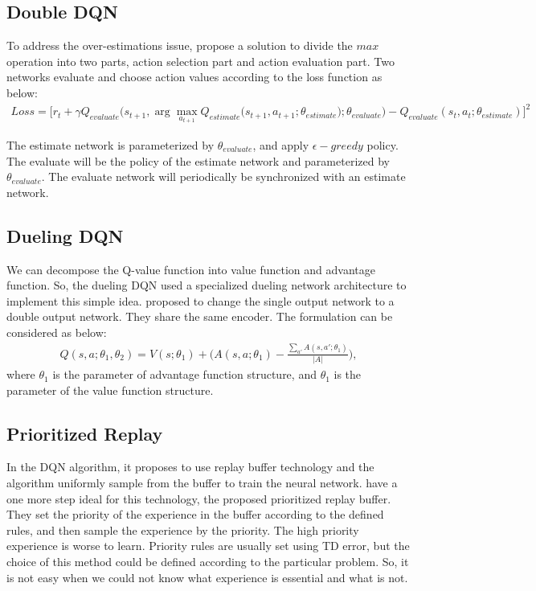 \documentclass{article}
\begin{document}
\subsection{Double DQN}

To address the over-estimations  issue, \citep{van2016deep} propose a solution to divide the $max$ operation into two parts, action selection part and action evaluation part.  Two networks evaluate and choose action values according to the loss function as below:
$$
\begin{aligned}
Loss=\Big[ r_t + \gamma {Q}_{evaluate} \Big(s_{t+1}, \arg \underset{a_{t+1}}{\max} {Q}_{estimate} \big(s_{t+1}, a_{t+1};{\theta}_{estimate} \big); {\theta}_{evaluate} \Big) - {Q}_{evaluate}(s_t,a_t;{\theta}_{estimate}) \Big]^2
\end{aligned}
$$

The estimate network is parameterized by ${\theta}_{evaluate}$, and apply $\epsilon-greedy$ policy. The evaluate will be the policy of the estimate network and parameterized by ${\theta}_{evaluate}$. The evaluate network will periodically be synchronized with an estimate network.

\subsection{Dueling DQN}

We can decompose the Q-value function into value function and advantage function. So, the dueling DQN used a specialized dueling network architecture to implement this simple idea. \citep{wang2015dueling} proposed to change the single output network to a double output network. They share the same encoder. The formulation can be considered as below:
$$
\begin{aligned}
{Q} (s,a;{\theta_{1}},{\theta_{2}}) =  {V}(s;{\theta_{1}}) + \Big({A} (s,a;{\theta_{1}}) - \frac{\sum_{a'} {A} (s,a';{\theta_{1}})}{|{A}|}		\Big) ,
\end{aligned}
$$
where $\theta_1$ is the parameter of advantage function structure, and $\theta_1$ is the parameter of the value function structure. 


\subsection{Prioritized Replay}

In the DQN algorithm, it proposes to use replay buffer technology and the algorithm uniformly sample from the buffer to train the neural network. \citep{schaul2015prioritized} have a one more step ideal for this technology, the proposed prioritized replay buffer. They set the priority of the experience in the buffer according to the defined rules, and then sample the experience by the priority. The high priority experience is worse to learn. Priority rules are usually set using TD error, but the choice of this method could be defined according to the particular problem. So, it is not easy when we could not know what experience is essential and what is not.
\end{document}
